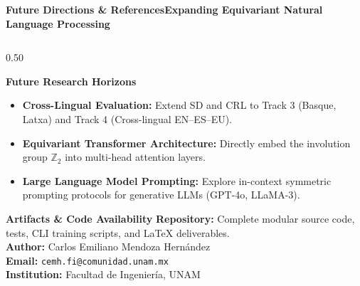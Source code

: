 \documentclass[aspectratio=169,10pt]{beamer}
\begin{document}
\begin{frame}{\textbf{Future Directions \& References}}{\textbf{Expanding Equivariant Natural Language Processing}}
  \begin{columns}[T]
    \begin{column}{0.50\textwidth}
      \begin{block}{\textbf{Future Research Horizons}}
        \small
        \begin{itemize}
          \item \textbf{Cross-Lingual Evaluation:} Extend SD and CRL to Track 3 (Basque, Latxa) and Track 4 (Cross-lingual EN--ES--EU).
          \item \textbf{Equivariant Transformer Architecture:} Directly embed the involution group $\mathbb{Z}_2$ into multi-head attention layers.
          \item \textbf{Large Language Model Prompting:} Explore in-context symmetric prompting protocols for generative LLMs (GPT-4o, LLaMA-3).
        \end{itemize}
      \end{block}
      \vspace{0.1cm}
      \begin{block}{\textbf{Artifacts \& Code Availability}}
        \small
        \textbf{Repository:} Complete modular source code, tests, CLI training scripts, and LaTeX deliverables. \\
        \textbf{Author:} Carlos Emiliano Mendoza Hernández \\
        \textbf{Email:} \texttt{cemh.fi@comunidad.unam.mx} \\
        \textbf{Institution:} Facultad de Ingeniería, UNAM
      \end{block}
    \end{column}


\end{columns}
\end{frame}
\end{document}
